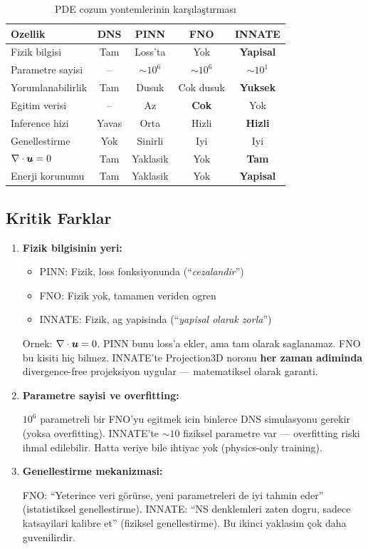 \begin{table}[H]
\centering
\caption{PDE cozum yontemlerinin karşılaştırması}
\label{tab:comparison}
\begin{tabular}{lcccc}
\toprule
\textbf{Ozellik} & \textbf{DNS} & \textbf{PINN} & \textbf{FNO} & \textbf{INNATE} \\
\midrule
Fizik bilgisi & Tam & Loss'ta & Yok & \textbf{Yapisal} \\
Parametre sayisi & -- & $\sim10^6$ & $\sim10^6$ & $\sim10^1$ \\
Yorumlanabilirlik & Tam & Dusuk & Cok dusuk & \textbf{Yuksek} \\
Egitim verisi & -- & Az & \textbf{Cok} & Yok \\
Inference hizi & Yavas & Orta & Hizli & \textbf{Hizli} \\
Genellestirme & Yok & Sinirli & Iyi & Iyi \\
$\nabla \cdot\bm{u}=0$ & Tam & Yaklasik & Yok & \textbf{Tam} \\
Enerji korunumu & Tam & Yaklasik & Yok & \textbf{Yapisal} \\
\bottomrule
\end{tabular}
\end{table}

\subsection{Kritik Farklar}

\begin{enumerate}
\item \textbf{Fizik bilgisinin yeri:}
\begin{itemize}
\item PINN: Fizik, loss fonksiyonunda (``\textit{cezalandir}'')
\item FNO: Fizik yok, tamamen veriden ogren
\item INNATE: Fizik, ag yapisinda (``\textit{yapisal olarak zorla}'')
\end{itemize}

Ornek: $\nabla \cdot\bm{u} = 0$. PINN bunu loss'a ekler, ama tam olarak saglanamaz. FNO bu kisiti hiç bilmez. INNATE'te Projection3D noronu \textbf{her zaman adiminda} divergence-free projeksiyon uygular --- matematiksel olarak garanti.

\item \textbf{Parametre sayisi ve overfitting:}

$10^6$ parametreli bir FNO'yu egitmek icin binlerce DNS simulasyonu gerekir (yoksa overfitting). INNATE'te $\sim10$ fiziksel parametre var --- overfitting riski ihmal edilebilir. Hatta veriye bile ihtiyac yok (physics-only training).

\item \textbf{Genellestirme mekanizmasi:}

FNO: ``Yeterince veri görürse, yeni parametreleri de iyi tahmin eder'' (istatistiksel genellestirme).
INNATE: ``NS denklemleri zaten dogru, sadece katsayilari kalibre et'' (fiziksel genellestirme). Bu ikinci yaklasim çok daha guvenilirdir.
\end{enumerate}



